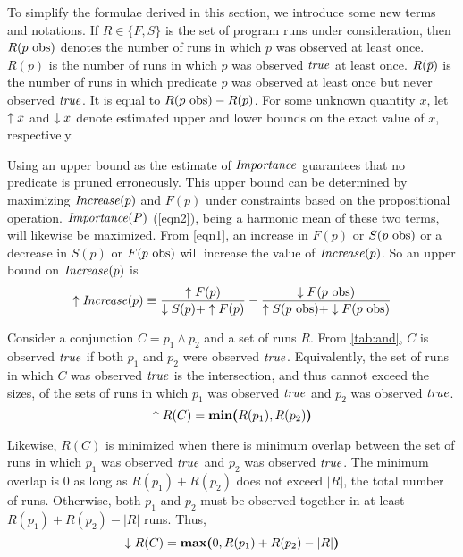 To simplify the formulae derived in this section, we introduce some new terms and
notations.  If $R \in \{F, S\}$ is the set of program runs under consideration, then
$R(\text{$p$ obs})$ denotes the number of runs in which $p$ was observed at least
once.  $R(p)$ is the number of runs in which $p$ was observed $\mathit{true}$ at least once.
$R(\text{$\bar{p}$})$ is the number of runs in which predicate $p$ was observed
at least once but never observed $\mathit{true}$.  It is equal to $R(\text{$p$ obs}) - R(p)$.
For some unknown quantity $x$, let $\uparrow x$ and $\downarrow x$ denote estimated upper
and lower bounds on the exact value of $x$, respectively.

Using an upper bound as the estimate of $\mathit{Importance}$ guarantees that no
predicate is pruned erroneously.  This upper bound can be determined by maximizing
$\mathit{Increase}(p)$ and $F(p)$ under constraints based on the propositional operation.
$\mathit{Importance}(P)$ (\autoref{eqn2}), being a harmonic mean of these two terms, will
likewise be maximized.  From \autoref{eqn1}, an increase in $F(p)$ or $S(\text{$p$ obs})$
or a decrease in $S(p)$ or $F(\text{$p$ obs})$ will increase the value of $\mathit{Increase}(p)$.
So an upper bound on $\mathit{Increase}(p)$ is
%
\begin{equation}
\label{eqn3}
\uparrow\mathit{Increase}(p) \equiv
\frac{\uparrow F(p)}{\downarrow S(p) + \uparrow F(p)}
-
\frac{\downarrow F(\text{$p$ obs})}{\uparrow S(\text{$p$ obs}) + \downarrow F(\text{$p$ obs})}
\end{equation}

Consider a conjunction $C = p_1 \wedge p_2$ and a set of runs $R$.  From \autoref{tab:and}, $C$ is
observed $\mathit{true}$ if both $p_1$ and $p_2$ were observed $\mathit{true}$.  Equivalently, the set
of runs in which $C$ was observed $\mathit{true}$ is the intersection,
and thus cannot exceed the sizes, of the sets of
runs in which $p_1$ was observed $\mathit{true}$ and $p_2$ was observed $\mathit{true}$.
\begin{equation*}
  \uparrow R(C) = \textbf{min(}R(p_1), R(p_2)\textbf{)}
\end{equation*}

Likewise, $R(C)$ is minimized when there is minimum overlap between the set
of runs in which $p_1$ was observed $\mathit{true}$ and $p_2$ was observed $\mathit{true}$.
The minimum overlap is $0$ as long as $R(p_1) + R(p_2)$ does not exceed $|R|$,
the total number of runs.  Otherwise, both $p_1$ and $p_2$ must be observed
together in at least $R(p_1) + R(p_2) - |R|$ runs.  Thus,
\begin{equation*}
  \downarrow R(C) = \textbf{max(}0, R(p_1) + R(p_2) - |R|\textbf{)}
\end{equation*}


